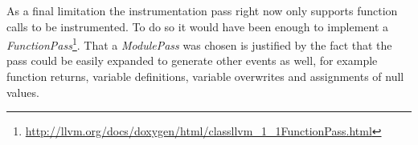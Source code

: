 As a final limitation the instrumentation pass right now only supports function calls to be instrumented.
To do so it would have been enough to implement a \emph{FunctionPass}\footnote{\url{http://llvm.org/docs/doxygen/html/classllvm_1_1FunctionPass.html}}.
That a \emph{ModulePass} was chosen is justified by the fact that the pass could be easily expanded to generate other events as well, for example function returns, variable definitions, variable overwrites and assignments of null values.

